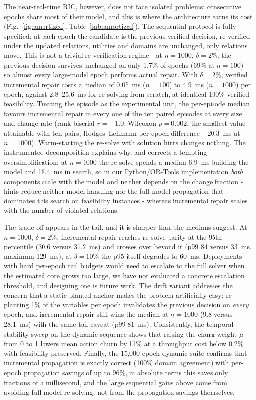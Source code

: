 \documentclass[pdflatex,sn-mathphys-num,iicol,oneside]{sn-jnl}
\begin{document}
The near-real-time RIC, however, does not face isolated problems:
consecutive epochs share most of their model, and this is where the
architecture earns its cost (Fig.~\ref{fig:amortized},
Table~\ref{tab:amortized}). The sequential protocol is fully
specified: at each epoch the candidate is the previous verified
decision, re-verified under the updated relations, utilities and
domains are unchanged, only relations move. This is not a trivial
re-verification regime - at $n=1000$, $\delta=2\%$, the previous
decision survives unchanged on only 1.7\% of epochs (69\% at
$n=100$) - so almost every large-model epoch performs actual repair.
With $\delta=2\%$, verified incremental repair costs a median of
0.05~ms ($n=100$) to 4.9~ms ($n=1000$) per epoch, against
2.8--25.6~ms for re-solving from scratch, at identical 100\% verified
feasibility. Treating the episode as the experimental unit, the
per-episode median favours incremental repair in every one of the ten
paired episodes at every size and change rate (rank-biserial
$r=-1.0$, Wilcoxon $p=0.002$, the smallest value attainable with ten
pairs, Hodges--Lehmann per-epoch difference $-20.3$~ms at $n=1000$).
Warm-starting the re-solve with solution hints changes nothing. The
instrumented decomposition explains why, and corrects a tempting
oversimplification: at $n=1000$ the re-solve spends a median 6.9~ms
building the model and 18.4~ms in search, so in our
Python/OR-Tools implementation \emph{both} components scale with the
model and neither depends on the change fraction - hints reduce
neither model handling nor the full-model propagation that dominates
this search on feasibility instances - whereas incremental repair
scales with the number of violated relations.

The trade-off appears in the tail, and it is sharper than the medians
suggest. At $n=1000$, $\delta=2\%$, incremental repair reaches
re-solve parity at the 95th percentile (30.6 versus 31.2~ms) and
crosses over beyond it (p99 84 versus 33~ms, maximum 129~ms), at
$\delta=10\%$ the p95 itself degrades to 60~ms. Deployments with hard
per-epoch tail budgets would need to escalate to the full solver when
the estimated core grows too large, we have not evaluated a concrete
escalation threshold, and designing one is future work. The drift
variant addresses the concern that a static planted anchor makes the
problem artificially easy: re-planting 1\% of the variables per epoch
invalidates the previous decision on \emph{every} epoch, and
incremental repair still wins the median at $n=1000$ (9.8 versus
28.1~ms) with the same tail caveat (p99 81~ms). Consistently, the
temporal-stability sweep on the dynamic sequence shows that raising
the churn weight $\mu$ from 0 to 1 lowers mean action churn by 11\% at
a throughput cost below 0.2\% with feasibility preserved. Finally, the
15{,}000-epoch dynamic suite confirms that incremental propagation is
exactly correct (100\% domain agreement) with per-epoch propagation
savings of up to 96\%, in absolute terms this saves only fractions of
a millisecond, and the large sequential gains above come from avoiding
full-model re-solving, not from the propagation savings themselves.
\end{document}
